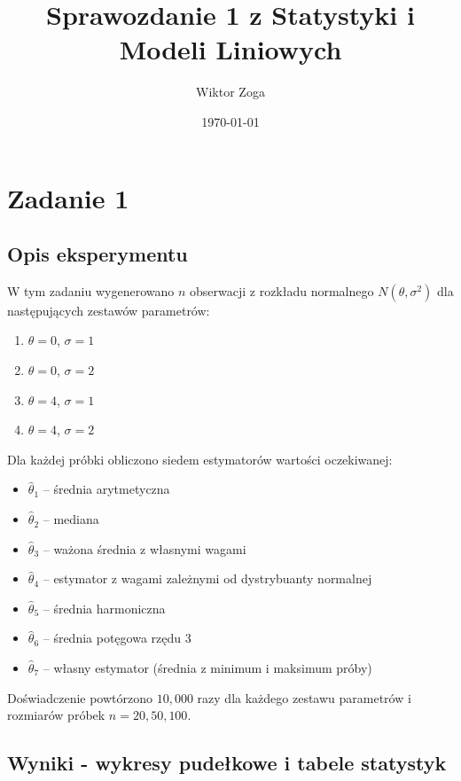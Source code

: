 \documentclass[a4paper,12pt]{article}
\title{Sprawozdanie 1 z Statystyki i Modeli Liniowych}
\author{Wiktor Zoga}
\date{\today}
\begin{document}
\maketitle
\newpage

\section{Zadanie 1}

\subsection{Opis eksperymentu}
W tym zadaniu wygenerowano $n$ obserwacji z rozkładu normalnego $N(\theta, \sigma^2)$ dla następujących zestawów parametrów:

\begin{enumerate}
    \item $\theta = 0$, $\sigma = 1$
    \item $\theta = 0$, $\sigma = 2$
    \item $\theta = 4$, $\sigma = 1$
    \item $\theta = 4$, $\sigma = 2$
\end{enumerate}

Dla każdej próbki obliczono siedem estymatorów wartości oczekiwanej:

\begin{itemize}
    \item $\hat{\theta}_1$ -- średnia arytmetyczna
    \item $\hat{\theta}_2$ -- mediana
    \item $\hat{\theta}_3$ -- ważona średnia z własnymi wagami
    \item $\hat{\theta}_4$ -- estymator z wagami zależnymi od dystrybuanty normalnej
    \item $\hat{\theta}_5$ -- średnia harmoniczna
    \item $\hat{\theta}_6$ -- średnia potęgowa rzędu 3
    \item $\hat{\theta}_7$ -- własny estymator (średnia z minimum i maksimum próby)
\end{itemize}

Doświadczenie powtórzono $10{,}000$ razy dla każdego zestawu parametrów i rozmiarów próbek $n = 20, 50, 100$.

\newpage

\subsection{Wyniki - wykresy pudełkowe i tabele statystyk}
\end{document}
